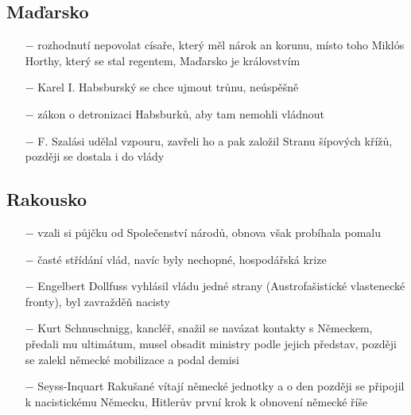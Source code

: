 \documentclass{article}
\begin{document}
\subsection*{Maďarsko}
\begin{itemize}
    \vspace{-0.5em}
    \setlength\itemsep{0.15em}
    \item[$-$] rozhodnutí nepovolat císaře, který měl nárok an korunu, místo toho Miklós Horthy, který se stal regentem, Maďarsko je královstvím
    \item[$-$] Karel I. Habsburský se chce ujmout trůnu, neúspěšně
    \item[$-$] zákon o detronizaci Habsburků, aby tam nemohli vládnout
    \item[$-$] F. Szalási udělal vzpouru, zavřeli ho a pak založil Stranu šípových křížů, později se dostala i do vlády
\end{itemize}

\subsection*{Rakousko}
\begin{itemize}
    \vspace{-0.5em}
    \setlength\itemsep{0.15em}
    \item[$-$] vzali si půjčku od Společenství národů, obnova však probíhala pomalu
    \item[$-$] časté střídání vlád, navíc byly nechopné, hospodářská krize
    \item[$-$] Engelbert Dollfuss vyhlásil vládu jedné strany (Austrofašistické vlastenecké fronty), byl zavražděň nacisty
    \item[$-$] Kurt Schnuschnigg, kancléř, snažil se navázat kontakty s Německem, předali mu ultimátum, musel obsadit ministry podle jejich představ, později se zalekl německé mobilizace a podal demisi
    \item[$-$] Seyss-Inquart Rakušané vítají německé jednotky a o den později se připojil k nacistickému Německu, Hitlerův první krok k obnovení německé říše
\end{itemize}
\end{document}

